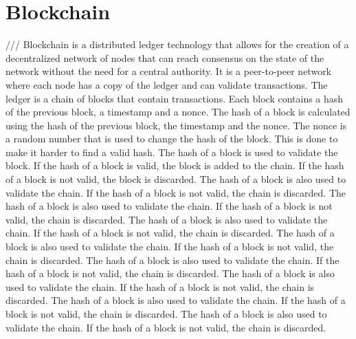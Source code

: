 \section{Blockchain}


///
Blockchain is a distributed ledger technology that allows for the creation of a decentralized network of nodes that can reach consensus on the state of the network without the need for a central authority. It is a peer-to-peer network where each node has a copy of the ledger and can validate transactions. The ledger is a chain of blocks that contain transactions. Each block contains a hash of the previous block, a timestamp and a nonce. The hash of a block is calculated using the hash of the previous block, the timestamp and the nonce. The nonce is a random number that is used to change the hash of the block. This is done to make it harder to find a valid hash. The hash of a block is used to validate the block. If the hash of a block is valid, the block is added to the chain. If the hash of a block is not valid, the block is discarded. The hash of a block is also used to validate the chain. If the hash of a block is not valid, the chain is discarded. The hash of a block is also used to validate the chain. If the hash of a block is not valid, the chain is discarded. The hash of a block is also used to validate the chain. If the hash of a block is not valid, the chain is discarded. The hash of a block is also used to validate the chain. If the hash of a block is not valid, the chain is discarded. The hash of a block is also used to validate the chain. If the hash of a block is not valid, the chain is discarded. The hash of a block is also used to validate the chain. If the hash of a block is not valid, the chain is discarded. The hash of a block is also used to validate the chain. If the hash of a block is not valid, the chain is discarded. The hash of a block is also used to validate the chain. If the hash of a block is not valid, the chain is discarded.